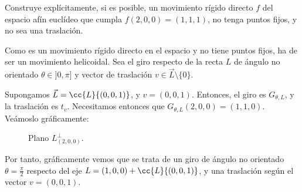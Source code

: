 \begin{ejercicio}
    Construye explícitamente, si es posible,
    un movimiento rígido directo $f$ del espacio afín euclídeo que cumpla
    $f(2,0,0)=(1,1,1)$, no tenga puntos fijos, y no sea una traslación.

    Como es un movimiento rígido directo en el espacio y no tiene puntos fijos, ha de
    ser un movimiento helicoidal. Sea el giro respecto de la recta $L$ de ángulo no orientado $\theta \in ]0, \pi]$ y vector de traslación $v\in \vec{L}\setminus \{0\}$.

    Supongamos $\vec{L}=\cc{L}\{(0,0,1)\}$, y $v=(0,0,1)$. Entonces, el giro es $G_{\theta, L}$, y la traslación es $t_v$.
    Necesitamos entonces que $G_{\theta, L}(2,0,0) = (1,1,0)$. Veámoslo gráficamente:
    \begin{figure}[H]
        \centering
        \caption{Plano $L_{(2,0,0)}^\perp$.}
    \end{figure}

    Por tanto, gráficamente vemos que se trata de un giro de ángulo no orientado $\theta = \frac{\pi}{2}$ respecto del eje $L=(1,0,0) + \cc{L}\{(0,0,1)\}$,
    y una traslación según el vector $v=(0,0,1)$.
\end{ejercicio}